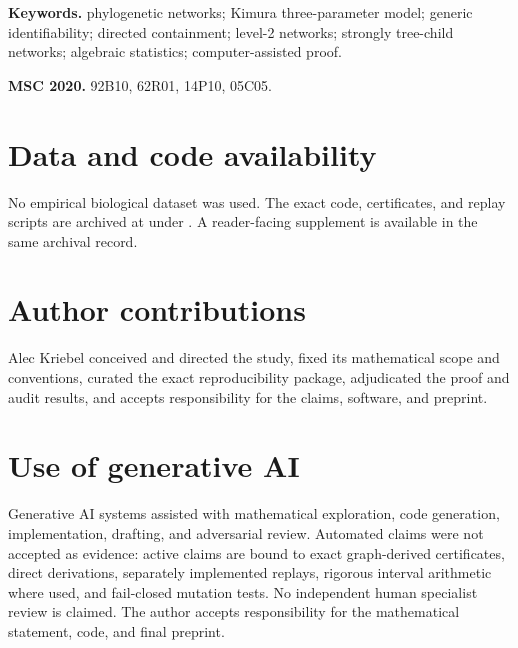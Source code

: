 \documentclass[11pt]{article}
\title{\KThreePTitle}
\author{Alec Kriebel\\
\small Independent Researcher\\
\small ORCID: \href{https://orcid.org/0009-0001-9320-500X}
{0009-0001-9320-500X}}
\date{August 2026}
\providecommand{\KThreePCanonicalRoot}{manuscript}
\providecommand{\KThreePSubmissionRoot}{submission}
\begin{document}
\maketitle

\begin{abstract}

\end{abstract}

\noindent\textbf{Keywords.} phylogenetic networks; Kimura three-parameter
model; generic identifiability; directed containment; level-2 networks;
strongly tree-child networks; algebraic statistics; computer-assisted proof.

\medskip
\noindent\textbf{MSC 2020.} 92B10, 62R01, 14P10, 05C05.



\section*{Data and code availability}

No empirical biological dataset was used. The exact code, certificates, and
replay scripts are archived at
\texttt{} under
\texttt{}. A reader-facing supplement is
available in the same archival record.

\section*{Author contributions}

Alec Kriebel conceived and directed the study, fixed its mathematical scope
and conventions, curated the exact reproducibility package, adjudicated the
proof and audit results, and accepts responsibility for the claims, software,
and preprint.

\section*{Use of generative AI}

Generative AI systems assisted with mathematical exploration, code
generation, implementation, drafting, and adversarial review. Automated
claims were not accepted as evidence: active claims are bound to exact
graph-derived certificates, direct derivations, separately implemented
replays, rigorous interval arithmetic where used, and fail-closed mutation
tests. No independent human specialist review is claimed. The author accepts
responsibility for the mathematical statement, code, and final preprint.

{\small
\raggedright


}
\end{document}
